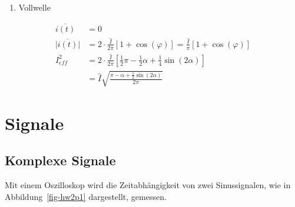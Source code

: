 \documentclass[
  ngerman,
  letterpaper,
]{scrbook}
\providecommand{\tightlist}{%
  \setlength{\itemsep}{0pt}\setlength{\parskip}{0pt}}
\begin{document}
\begin{enumerate}
\def\labelenumi{\arabic{enumi}.}
\setcounter{enumi}{1}
\tightlist
\item
  Vollwelle
\end{enumerate}

\begin{align}
\overline{i(t)} &= 0 \\
\overline{\lvert i(t) \lvert} &=  2 \cdot \frac{\hat{I}}{2\pi} \left[ 1+\cos(\varphi) \right] = \frac{\hat{I}}{\pi} \left[ 1+\cos(\varphi) \right] \\
I^2_{eff} &= 2 \cdot \frac{\hat{I}}{2\pi} \left[ \frac{1}{2}\pi-\frac{1}{2}\alpha + \frac{1}{4}\sin(2\alpha) \right] \\
&= \hat{I} \sqrt{\frac{\pi-\alpha +\frac{1}{2}\sin(2\alpha)}{2\pi}}
\end{align}

\chapter{Signale}\label{signale}

\section{Komplexe Signale}\label{komplexe-signale}

Mit einem Oszilloskop wird die Zeitabhängigkeit von zwei Sinussignalen,
wie in Abbildung~\ref{fig-hw2p1} dargestellt, gemessen.
\end{document}
